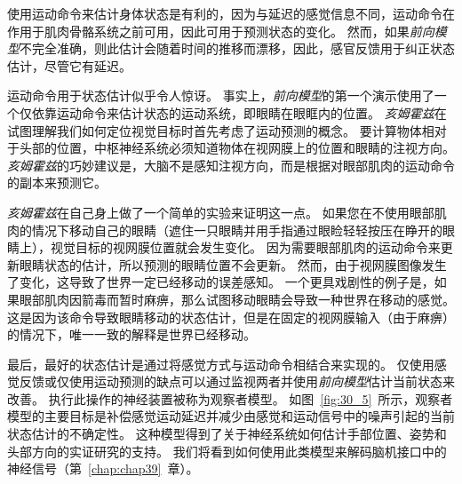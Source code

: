 使用运动命令来估计身体状态是有利的，因为与延迟的感觉信息不同，运动命令在作用于肌肉骨骼系统之前可用，因此可用于预测状态的变化。
然而，如果\textit{前向模型}不完全准确，则此估计会随着时间的推移而漂移，因此，感官反馈用于纠正状态估计，尽管它有延迟。


运动命令用于状态估计似乎令人惊讶。
事实上，\textit{前向模型}的第一个演示使用了一个仅依靠运动命令来估计状态的运动系统，即眼睛在眼眶内的位置。
\textit{亥姆霍兹}在试图理解我们如何定位视觉目标时首先考虑了运动预测的概念。
要计算物体相对于头部的位置，中枢神经系统必须知道物体在视网膜上的位置和眼睛的注视方向。
\textit{亥姆霍兹}的巧妙建议是，大脑不是感知注视方向，而是根据对眼部肌肉的运动命令的副本来预测它。


\textit{亥姆霍兹}在自己身上做了一个简单的实验来证明这一点。
如果您在不使用眼部肌肉的情况下移动自己的眼睛（遮住一只眼睛并用手指通过眼睑轻轻按压在睁开的眼睛上），视觉目标的视网膜位置就会发生变化。
因为需要眼部肌肉的运动命令来更新眼睛状态的估计，所以预测的眼睛位置不会更新。
然而，由于视网膜图像发生了变化，这导致了世界一定已经移动的误差感知。
一个更具戏剧性的例子是，如果眼部肌肉因箭毒而暂时麻痹，那么试图移动眼睛会导致一种世界在移动的感觉。
这是因为该命令导致眼睛移动的状态估计，但是在固定的视网膜输入（由于麻痹）的情况下，唯一一致的解释是世界已经移动。


最后，最好的状态估计是通过将感觉方式与运动命令相结合来实现的。
仅使用感觉反馈或仅使用运动预测的缺点可以通过监视两者并使用\textit{前向模型}估计当前状态来改善。
执行此操作的神经装置被称为观察者模型。
如图~\ref{fig:30_5}~所示，观察者模型的主要目标是补偿感觉运动延迟并减少由感觉和运动信号中的噪声引起的当前状态估计的不确定性。
这种模型得到了关于神经系统如何估计手部位置、姿势和头部方向的实证研究的支持。
我们将看到如何使用此类模型来解码脑机接口中的神经信号（第~\ref{chap:chap39}~章）。


